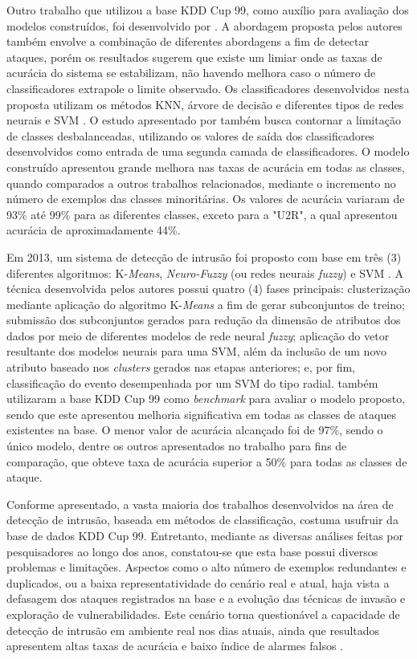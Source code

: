 Outro trabalho que utilizou a base KDD Cup 99, como auxílio para avaliação dos modelos construídos, foi desenvolvido por . A abordagem proposta pelos autores também envolve a combinação de diferentes abordagens a fim de detectar ataques, porém os resultados sugerem que existe um limiar onde as taxas de acurácia do sistema se estabilizam, não havendo melhora caso o número de classificadores extrapole o limite observado. Os classificadores desenvolvidos nesta proposta utilizam os métodos KNN, árvore de decisão e diferentes tipos de redes neurais e SVM \cite{mitchell1997}. O estudo apresentado por  também busca contornar a limitação de classes desbalanceadas, utilizando os valores de saída dos classificadores desenvolvidos como entrada de uma segunda camada de classificadores. O modelo construído apresentou grande melhora nas taxas de acurácia em todas as classes, quando comparados a outros trabalhos relacionados, mediante o incremento no número de exemplos das classes minoritárias. Os valores de acurácia variaram de 93\% até 99\% para as diferentes classes, exceto para a "U2R", a qual apresentou acurácia de aproximadamente 44\%.

Em 2013, um sistema de detecção de intrusão foi proposto com base em três (3) diferentes algoritmos: K-\textit{Means}, \textit{Neuro-Fuzzy} (ou redes neurais \textit{fuzzy}) e SVM \cite{chandrasekhar2013}. A técnica desenvolvida pelos autores possui quatro (4) fases principais: clusterização mediante aplicação do algoritmo K-\textit{Means} a fim de gerar subconjuntos de treino; submissão dos subconjuntos gerados para redução da dimensão de atributos dos dados por meio de diferentes modelos de rede neural \textit{fuzzy}; aplicação do vetor resultante dos modelos neurais para uma SVM, além da inclusão de um novo atributo baseado nos \textit{clusters} gerados nas etapas anteriores; e, por fim, classificação do evento desempenhada por um SVM do tipo radial.  também utilizaram a base KDD Cup 99 como \textit{benchmark} para avaliar o modelo proposto, sendo que este apresentou melhoria significativa em todas as classes de ataques existentes na base. O menor valor de acurácia alcançado foi de 97\%, sendo o único modelo, dentre os outros apresentados no trabalho para fins de comparação, que obteve taxa de acurácia superior a 50\% para todas as classes de ataque.

Conforme apresentado, a vasta maioria dos trabalhos desenvolvidos na área de detecção de intrusão, baseada em métodos de classificação, costuma usufruir da base de dados KDD Cup 99. Entretanto, mediante as diversas análises feitas por pesquisadores ao longo dos anos, constatou-se que esta base possui diversos problemas e limitações. Aspectos como o alto número de exemplos redundantes e duplicados, ou a baixa representatividade do cenário real e atual, haja vista a defasagem dos ataques registrados na base e a evolução das técnicas de invasão e exploração de vulnerabilidades. Este cenário torna questionável a capacidade de detecção de intrusão em ambiente real nos dias atuais, ainda que resultados apresentem altas taxas de acurácia e baixo índice de alarmes falsos \cite{mchugh2000, tavallaee2009, wang2014}.

